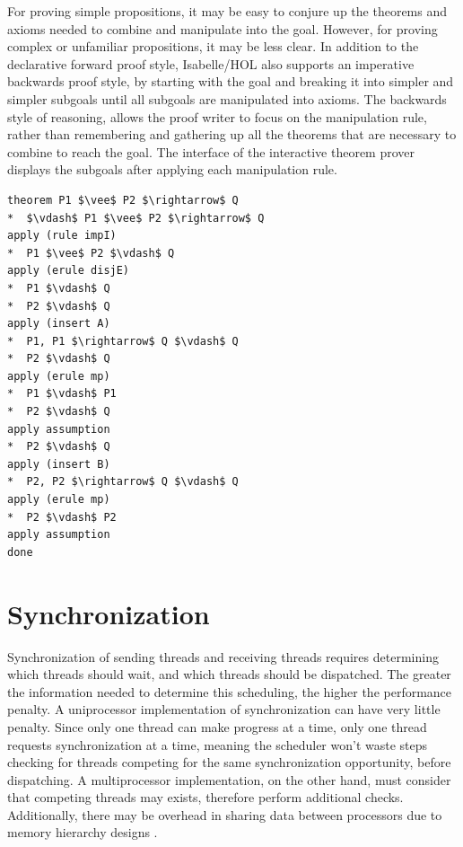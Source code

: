 \documentclass[letterpaper, 11pt]{extarticle}
\begin{document}
For proving simple propositions, it may be easy to conjure up the theorems and axioms needed to
combine and manipulate into the goal. However, for proving complex or unfamiliar propositions,
it may be less clear. In addition to the declarative forward proof style, Isabelle/HOL also
supports an imperative backwards proof style, by starting with the goal and breaking it into simpler
and simpler subgoals until all subgoals are manipulated into axioms. The backwards style of reasoning,
allows the proof
writer to focus on the manipulation rule, rather than remembering and gathering up all the theorems that are
necessary to combine to reach the goal. The interface of the interactive theorem prover displays the subgoals
after applying each manipulation rule.


\begin{lstlisting}[language=logic, mathescape]
theorem P1 $\vee$ P2 $\rightarrow$ Q
*  $\vdash$ P1 $\vee$ P2 $\rightarrow$ Q
apply (rule impI)
*  P1 $\vee$ P2 $\vdash$ Q
apply (erule disjE)
*  P1 $\vdash$ Q
*  P2 $\vdash$ Q
apply (insert A)
*  P1, P1 $\rightarrow$ Q $\vdash$ Q
*  P2 $\vdash$ Q
apply (erule mp)
*  P1 $\vdash$ P1
*  P2 $\vdash$ Q
apply assumption 
*  P2 $\vdash$ Q
apply (insert B)
*  P2, P2 $\rightarrow$ Q $\vdash$ Q
apply (erule mp)
*  P2 $\vdash$ P2
apply assumption 
done

\end{lstlisting}


\section{Synchronization}
Synchronization of sending threads and receiving threads
requires determining which threads should wait, and which threads should be dispatched.
The greater the information needed
to determine this scheduling, the higher the performance penalty. A uniprocessor
implementation of synchronization can have very little penalty. Since only one thread can make
progress at a time, only one thread requests synchronization at a time, meaning the scheduler
won't waste steps checking for threads competing for the same synchronization opportunity,
before dispatching. A multiprocessor implementation, on the other hand, must consider that
competing threads may exists, therefore perform additional checks. Additionally, there may be 
overhead in sharing data between processors due to memory hierarchy designs \cite{hennessy2011computer}. 
\end{document}
